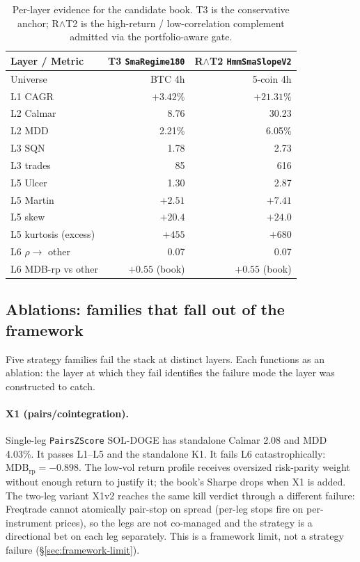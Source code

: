 \documentclass[11pt]{article}
\begin{document}
\begin{table}[h]
\centering
\small
\begin{tabular}{lrr}
\toprule
Layer / Metric & T3 \texttt{SmaRegime180} & R$\wedge$T2 \texttt{HmmSmaSlopeV2} \\
\midrule
Universe & BTC 4h & 5-coin 4h \\
L1 CAGR & $+3.42\%$ & $+21.31\%$ \\
L2 Calmar & 8.76 & 30.23 \\
L2 MDD & 2.21\% & 6.05\% \\
L3 SQN & 1.78 & 2.73 \\
L3 trades & 85 & 616 \\
L5 Ulcer & 1.30 & 2.87 \\
L5 Martin & $+2.51$ & $+7.41$ \\
L5 skew & $+20.4$ & $+24.0$ \\
L5 kurtosis (excess) & $+455$ & $+680$ \\
L6 $\rho \to$ other & 0.07 & 0.07 \\
L6 MDB-rp vs other & $+0.55$ (book) & $+0.55$ (book) \\
\bottomrule
\end{tabular}
\caption{Per-layer evidence for the candidate book. T3 is the
conservative anchor; R$\wedge$T2 is the high-return / low-correlation
complement admitted via the portfolio-aware gate.}
\label{tab:layer-evidence}
\end{table}

\subsection{Ablations: families that fall out of the framework}
\label{sec:ablations}

Five strategy families fail the stack at distinct layers. Each functions as
an ablation: the layer at which they fail identifies the failure mode the
layer was constructed to catch.

\paragraph{X1 (pairs/cointegration).} Single-leg \texttt{PairsZScore}
SOL-DOGE has standalone Calmar 2.08 and MDD 4.03\%. It passes L1--L5 and
the standalone K1. It fails L6 catastrophically:
$\mathrm{MDB}_{\mathrm{rp}} = -0.898$. The low-vol return profile receives
oversized risk-parity weight without enough return to justify it; the book's
Sharpe drops when X1 is added. The two-leg variant X1v2
\citep{result_pairs_v2} reaches the same kill verdict through a different
failure: Freqtrade cannot atomically pair-stop on spread (per-leg stops fire
on per-instrument prices), so the legs are not co-managed and the strategy
is a directional bet on each leg separately. This is a framework limit, not
a strategy failure (\S\ref{sec:framework-limit}).
\end{document}
